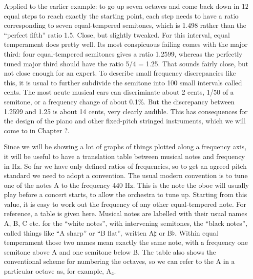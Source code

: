   Applied to the earlier example: to go up seven octaves and come back down in 
  12 equal steps to reach exactly the starting point, each step needs to have a 
  ratio corresponding to seven equal-tempered semitones, which is 1.498 rather 
  than the ``perfect fifth'' ratio 1.5. Close, but slightly tweaked. For this 
  interval, equal temperament does pretty well. Its most conspicuous failing 
  comes with the major third: four equal-tempered semitones gives a ratio 
  1.2599, whereas the perfectly tuned major third should have the ratio 5/4 = 
  1.25. That sounds fairly close, but not close enough for an expert. To 
  describe small frequency discrepancies like this, it is usual to further 
  subdivide the semitone into 100 small intervals called cents. The most acute 
  musical ears can discriminate about 2 cents, 1/50 of a semitone, or a 
  frequency change of about 0.1\%. But the discrepancy between 1.2599 and 1.25 
  is about 14 cents, very clearly audible. This has consequences for the design 
  of the piano and other fixed-pitch stringed instruments, which we will come 
  to in Chapter ?. 

  Since we will be showing a lot of graphs of things plotted along a frequency 
  axis, it will be useful to have a translation table between musical notes and 
  frequency in Hz. So far we have only defined ratios of frequencies, so to get 
  an agreed pitch standard we need to adopt a convention. The usual modern 
  convention is to tune one of the notes A to the frequency 440 Hz. This is the 
  note the oboe will usually play before a concert starts, to allow the 
  orchestra to tune up. Starting from this value, it is easy to work out the 
  frequency of any other equal-tempered note. For reference, a table is given 
  here. Musical notes are labelled with their usual names A, B, C etc. for the 
  ``white notes'', with intervening semitones, the ``black notes'', called 
  things like ``A sharp'' or ``B flat'', written A$\sharp$ or B$\flat$. Within 
  equal temperament those two names mean exactly the same note, with a 
  frequency one semitone above A and one semitone below B. The table also shows 
  the conventional scheme for numbering the octaves, so we can refer to the A 
  in a particular octave as, for example, A$_4$. 

